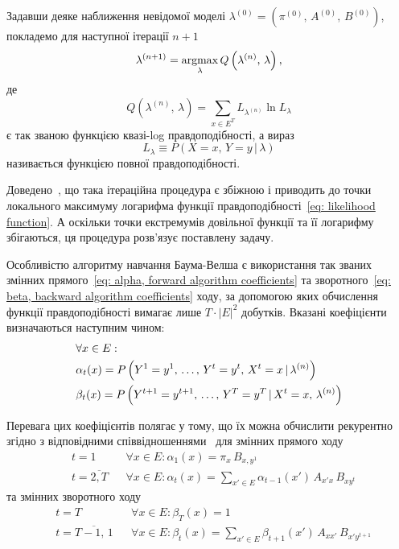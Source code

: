 Задавши деяке наближення невідомої моделі $\lambda^{(0)}=(\pi^{(0)},\,A^{(0)},\,B^{(0)})$, покладемо для наступної ітерації $n+1$
\begin{equation*}
    \lambda^{(n+1)} = \operatorname*{argmax}\limits_{\lambda} Q\left( \lambda^{(n)},\,\lambda \right),
\end{equation*}
де
\begin{equation}\label{eq: Q quasi-log likelihood function}
    Q\left( \lambda^{(n)},\,\lambda \right) = \sum\limits_{x \in E^T}L_{\lambda^{(n)}} \ln L_{\lambda}
\end{equation}
є так званою функцією квазі-log правдоподібності, а вираз
\begin{equation*}
    L_{\lambda} \equiv P\left( X=x,\,Y=y \,|\, \lambda \right)
\end{equation*}
називається функцією повної правдоподібності.

Доведено~\cite[розділ 4]{Koski2001}, що така ітераційна процедура є збіжною і приводить до точки локального максимуму логарифма функції правдоподібності~\eqref{eq: likelihood function}. А оскільки точки екстремумів довільної функції та її логарифму збігаються, ця процедура розв'язує поставлену задачу.

Особливістю алгоритму навчання Баума-Велша є використання так званих змінних прямого~\eqref{eq: alpha, forward algorithm coefficients} та зворотного~\eqref{eq: beta, backward algorithm coefficients} ходу, за допомогою яких обчислення функції правдоподібності вимагає лише $T\cdot|E|^2$ добутків. Вказані коефіцієнти визначаються наступним чином:
\begin{align}
    & \forall x \in E: \notag \\
    & \alpha_t(x) = P\left( Y^1=y^1,\,\ldots,\,Y^t=y^t,\,X^t=x \,|\, \lambda^{(n)} \right) \label{eq: alpha, forward algorithm coefficients} \\
    & \beta_t(x) = P\left( Y^{t+1}=y^{t+1},\,\ldots,\,Y^T=y^T \,|\, X^t=x,\, \lambda^{(n)} \right) \label{eq: beta, backward algorithm coefficients}
\end{align}

Перевага цих коефіцієнтів полягає у тому, що їх можна обчислити рекурентно згідно з відповідними співвідношеннями~\cite[розділ 5]{Nilsson2005} для змінних прямого ходу
\begin{align*}
    & t = 1              && \forall x \in E: \alpha_1(x)=\pi_{x}\,B_{x,y^1} \\
    & t = \overline{2,T} && \forall x \in E: \alpha_{t}(x)=\sum\limits_{x'\in E}\alpha_{t-1}(x')\,A_{x'x}\,B_{xy^{t}} 
\end{align*}
та змінних зворотного ходу
\begin{align*}
    & t = T                && \forall x \in E: \beta_T(x)=1 \\
    & t = \overline{T-1,\,1} && \forall x \in E: \beta_t(x)=\sum\limits_{x' \in E}\beta_{t+1}(x')\,A_{x x'}\,B_{x'y^{t+1}}
\end{align*}

